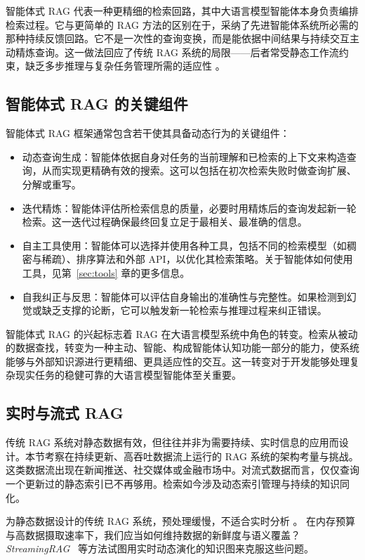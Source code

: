 智能体式 RAG 代表一种更精细的检索回路，其中大语言模型智能体本身负责编排检索过程。它与更简单的 RAG 方法的区别在于，采纳了先进智能体系统所必需的那种持续反馈回路。它不是一次性的查询变换，而是能依据中间结果与持续交互主动精炼查询。这一做法回应了传统 RAG 系统的局限——后者常受静态工作流约束，缺乏多步推理与复杂任务管理所需的适应性 \citep{singh2025agentic}。

\subsection{智能体式 RAG 的关键组件}

智能体式 RAG 框架通常包含若干使其具备动态行为的关键组件：

\begin{itemize}
    \item 动态查询生成：智能体依据自身对任务的当前理解和已检索的上下文来构造查询，从而实现更精确有效的搜索。这可以包括在初次检索失败时做查询扩展、分解或重写。
    \item 迭代精炼：智能体评估所检索信息的质量，必要时用精炼后的查询发起新一轮检索。这一迭代过程确保最终回复立足于最相关、最准确的信息。
    \item 自主工具使用：智能体可以选择并使用各种工具，包括不同的检索模型（如稠密与稀疏）、排序算法和外部 API，以优化其检索策略。关于智能体如何使用工具，见第~\ref{sec:tools} 章的更多信息。
    \item 自我纠正与反思：智能体可以评估自身输出的准确性与完整性。如果检测到幻觉或缺乏支撑的论断，它可以触发新一轮检索与推理过程来纠正错误。
\end{itemize}
%
智能体式 RAG 的兴起标志着 RAG 在大语言模型系统中角色的转变。检索从被动的数据查找，转变为一种主动、智能、构成智能体认知功能一部分的能力，使系统能够与外部知识源进行更精细、更具适应性的交互。这一转变对于开发能够处理复杂现实任务的稳健可靠的大语言模型智能体至关重要。



\subsection{实时与流式 RAG}

传统 RAG 系统对静态数据有效，但往往并非为需要持续、实时信息的应用而设计。本节考察在持续更新、高吞吐数据流上运行的 RAG 系统的架构考量与挑战。这类数据流出现在新闻推送、社交媒体或金融市场中。对流式数据而言，仅仅查询一个更新过的静态索引已不再够用。检索如今涉及动态索引管理与持续的知识同化。

为静态数据设计的传统 RAG 系统，预处理缓慢，不适合实时分析 \citep{zhu2025staticdynamicstreamingrag,sankaradas2025streamingragrealtimecontextualretrieval}。%
在内存预算与高数据摄取速率下，我们应当如何维持数据的新鲜度与语义覆盖？\emph{StreamingRAG}~\citep{sankaradas2025streamingragrealtimecontextualretrieval} 等方法试图用实时动态演化的知识图来克服这些问题。

